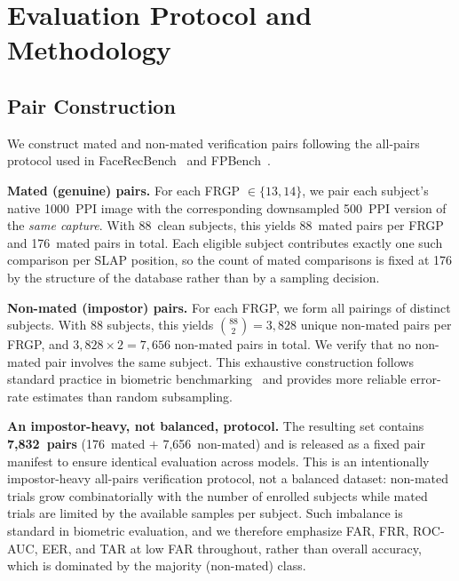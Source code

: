 \documentclass[journal]{IEEEtran}
\begin{document}
\section{Evaluation Protocol and Methodology}
\label{sec:method}

\subsection{Pair Construction}
\label{sec:pairs}

We construct mated and non-mated verification pairs following the
all-pairs protocol used in FaceRecBench~\cite{facerecbench2025} and
FPBench~\cite{fpbench2025}.

\textbf{Mated (genuine) pairs.}
For each FRGP $\in \{13, 14\}$, we pair each subject's native 1000~PPI
image with the corresponding downsampled 500~PPI version of the
\emph{same capture}.
With 88~clean subjects, this yields 88~mated pairs per FRGP and 176~mated
pairs in total.
Each eligible subject contributes exactly one such comparison per SLAP
position, so the count of mated comparisons is fixed at 176 by the
structure of the database rather than by a sampling decision.

\textbf{Non-mated (impostor) pairs.}
For each FRGP, we form all pairings of distinct subjects.
With 88 subjects, this yields $\binom{88}{2} = 3{,}828$ unique non-mated
pairs per FRGP, and $3{,}828 \times 2 = 7{,}656$ non-mated pairs in total.
We verify that no non-mated pair involves the same subject.
This exhaustive construction follows standard practice in biometric
benchmarking~\cite{facerecbench2025} and provides more reliable
error-rate estimates than random subsampling.

\textbf{An impostor-heavy, not balanced, protocol.}
The resulting set contains \textbf{7,832~pairs}
(176~mated $+$ 7,656~non-mated) and is released as a fixed pair manifest
to ensure identical evaluation across models.
This is an intentionally impostor-heavy all-pairs verification protocol,
not a balanced dataset: non-mated trials grow combinatorially with the
number of enrolled subjects while mated trials are limited by the
available samples per subject.
Such imbalance is standard in biometric evaluation, and we therefore
emphasize FAR, FRR, ROC-AUC, EER, and TAR at low FAR throughout, rather
than overall accuracy, which is dominated by the majority (non-mated)
class.
\end{document}
